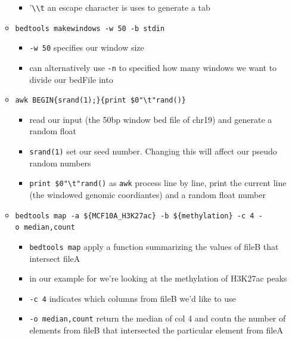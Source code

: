 \documentclass[
]{book}
\providecommand{\tightlist}{%
  \setlength{\itemsep}{0pt}\setlength{\parskip}{0pt}}
\begin{document}
\begin{itemize}
\begin{itemize}
    \begin{itemize}
    \tightlist
    \item
      '\texttt{\textbackslash{}\textbackslash{}t} an escape character is uses to generate a tab
    \end{itemize}
  \item
    \texttt{bedtools\ makewindows\ -w\ 50\ -b\ stdin}

    \begin{itemize}
    \tightlist
    \item
      \texttt{-w\ 50} specifies our window size
    \item
      can alternatively use \texttt{-n} to specified how many windows we want to divide our bedFile into
    \end{itemize}
  \item
    \texttt{awk\ \textquotesingle{}BEGIN\{srand(1);\}\{print\ \$0"\textbackslash{}t"rand()\}\textquotesingle{}}

    \begin{itemize}
    \tightlist
    \item
      read our input (the 50bp window bed file of chr19) and generate a random float
    \item
      \texttt{srand(1)} set our seed number. Changing this will affect our pseudo random numbers
    \item
      \texttt{print\ \$0"\textbackslash{}t"rand()} as \texttt{awk} process line by line, print the current line (the windowed genomic coordiantes) and a random float number
    \end{itemize}
  \item
    \texttt{bedtools\ map\ -a\ \$\{MCF10A\_H3K27ac\}\ -b\ \$\{methylation\}\ -c\ 4\ -o\ median,count}

    \begin{itemize}
    \tightlist
    \item
      \texttt{bedtools\ map} apply a function summarizing the values of fileB that intersect fileA
    \item
      in our example for we're looking at the methylation of H3K27ac peaks
    \item
      \texttt{-c\ 4} indicates which columns from fileB we'd like to use
    \item
      \texttt{-o\ median,count} return the median of col 4 and coutn the number of elements from fileB that intersected the particular element from fileA
    \end{itemize}
  \end{itemize}
\end{itemize}
\end{document}
